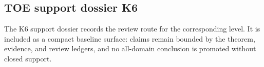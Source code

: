 \subsection{TOE support dossier K6}
The K6 support dossier records the review route for the corresponding level. It is included as a compact baseline surface: claims remain bounded by the theorem, evidence, and review ledgers, and no all-domain conclusion is promoted without closed support.
